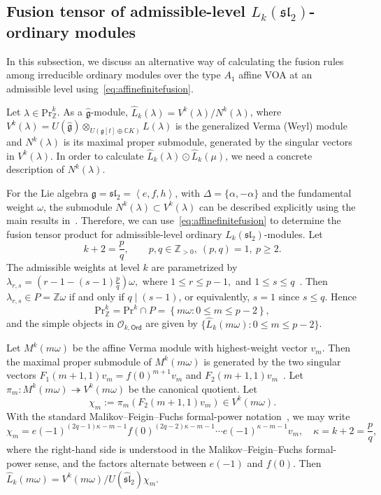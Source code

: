 \documentclass[12pt,a4paper,reqno]{amsart}
\numberwithin{equation}{section}
\theoremstyle{definition}
\newcommand{\g}{\mathfrak{g}}
\renewcommand{\sl}{\mathfrak{sl}}
\newcommand{\C}{\mathbb{C}}
\newcommand{\Z}{\mathbb{Z}}
\def\O{\mathcal{O}}
\def\Ord{\mathsf{Ord}}
\def\Pr{\mathrm{Pr}}
\def\la{\lambda}
\def \al{\alpha}
\def\om{\omega}
\def\o{\otimes}
\def\op{\oplus}
\begin{document}
\subsection{Fusion tensor of admissible-level $L_{k}(\sl_2)$-ordinary modules}\label{subsec:sl2fusion}
In this subsection, we discuss an alternative way of calculating the fusion rules among irreducible ordinary modules over the type $A_1$ affine VOA at an admissible level using~\eqref{eq:affinefinitefusion}.

Let $\la\in \Pr^k_\Z$. As a $\hat{\g}$-module, $\hat{L}_k(\la)=V^k(\la)/N^k(\la)$, where $V^k(\la)=U(\hat{\g})\o_{U(\g[t]\op\C K)}L(\la)$ is the generalized Verma (Weyl) module and $N^k(\la)$ is its maximal proper submodule, generated by the singular vectors in $V^k(\la)$.
In order to calculate $\hat{L}_k(\la)\odot \hat{L}_k(\mu)$, we need a concrete description of $N^k(\la)$.

For the Lie algebra $\g=\sl_2 = \left<e,f,h\right>$, with $\Delta=\{\al,-\al\}$ and the fundamental weight $\omega$, the submodule $N^k(\la)\subset V^k(\la)$ can be described explicitly using the main results in~\cite{malikov1986singular}. Therefore, we can use~\eqref{eq:affinefinitefusion} to determine the fusion tensor product for admissible-level ordinary $L_k(\sl_2)$-modules.
Let
\[
k+2=\frac{p}{q},\qquad p,q\in \Z_{>0},\ (p,q)=1,\ p\geq 2.
\]
The admissible weights at level $k$ are parametrized by
$
\la_{r,s}
=
\left(
r-1-(s-1)\frac{p}{q}
\right)\omega,
$
where
$
1\leq r\leq p-1,
$ and $
1\leq s\leq q$~\cite{kac1989classification,DLM96}.
 Then $\la_{r,s}\in P=\Z\om$ if and only if
$
q\mid (s-1)
$, or equivalently, $s=1$ since $s\leq q$. Hence
\begin{equation}\label{eq:6.9}
    \Pr^k_\Z
=
\Pr^k\cap P
=
\left\{
m\omega:
0\leq m\leq p-2
\right\},
\end{equation}
and the simple objects in $\O_{k,\Ord}$ are given by $\{\hat{L}_k(m\om):0\leq m\leq p-2\}$.


Let $M^k(m\omega)$ be the affine Verma module with highest-weight vector $v_m$. Then the maximal proper submodule of $M^k(m\om)$ is generated by the two singular vectors $F_1(m+1,1)v_m=f(0)^{m+1}v_m$ and $F_2(m+1,1)v_m$~\cite{DLM96,malikov1986singular}. Let
$
\pi_m:M^k(m\omega)\twoheadrightarrow V^k(m\omega)
$
be the canonical quotient. Let
\[
\chi_m:=\pi_m(F_2(m+1,1)v_m)\in V^k(m\om).
\]
With the standard Malikov--Feigin--Fuchs formal-power notation~\cite{malikov1986singular}, we may write
\begin{equation}\label{eq:MFFsingular}
\chi_m=
e(-1)^{(2q-1)\kappa-m-1}
f(0)^{(2q-2)\kappa-m-1}
\cdots
e(-1)^{\kappa-m-1}v_m,\quad \kappa= k+2=\frac{p}{q},
\end{equation}
where the right-hand side is understood in the Malikov--Feigin--Fuchs formal-power sense, and the factors alternate between $e(-1)$ and $f(0)$. Then $\hat{L}_k(m\om)=V^k(m\om)/U(\hat{\sl}_2)\chi_m$.
\end{document}
